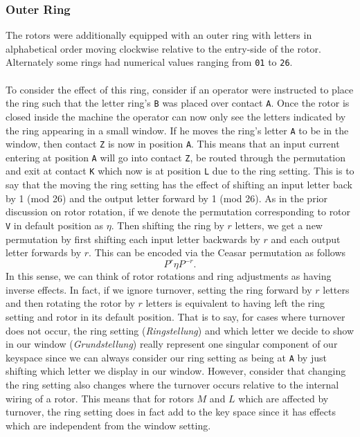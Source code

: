 \subsubsection{Outer Ring}

The rotors were additionally equipped with an outer ring with
letters in alphabetical order moving clockwise relative to the
entry-side of the rotor. Alternately some rings had numerical values
ranging from \texttt{01} to \texttt{26}.
\\\\To consider the effect of this ring,
consider if an operator were instructed to place the ring such that
the letter ring's \texttt{B} was placed over contact \texttt{A}. Once
the rotor is closed inside the machine
the operator can now only see the letters indicated by the ring
appearing in a small window. If he moves the ring's letter \texttt{A}
to be in the window, then contact \texttt{Z} is now in position
\texttt{A}. This means that an input current
entering at position \texttt{A} will go into contact \texttt{Z}, be
routed through the permutation and exit
at contact \texttt{K} which now is at position \texttt{L} due to the
ring setting. This is to say that the moving the ring
setting has the effect of shifting an input letter back by 1 (mod 26)
and the output letter forward by 1 (mod 26).
As in the prior discussion on rotor rotation, if we denote the
permutation corresponding to rotor \texttt{V} in default position as
$\eta$. Then shifting the ring by $r$ letters, we get a new
permutation by first shifting each input letter backwards by $r$ and
each output letter forwards by $r$. This can be encoded via the
Ceasar permutation as follows
\[
  {P^{r}}\eta{P^{-r}}.
\]
In this sense, we can think of rotor rotations and ring adjustments
as having inverse effects. In fact, if we ignore turnover, setting
the ring forward by $r$ letters and then rotating the rotor by $r$
letters is equivalent to having left the ring setting and rotor in
its default position. That is to say, for cases where turnover does
not occur, the ring setting (\emph{Ringstellung}) and which letter
we decide to show in our window (\emph{Grundstellung}) really
represent one singular component of our keyspace since we can always
consider our ring setting as being at \texttt{A} by just shifting
which letter we display in our window.
However, consider that changing the ring
setting also changes where the turnover occurs relative to the
internal wiring of a rotor. This means that for rotors $M$ and $L$
which are affected by turnover, the ring setting does in fact add to
the key space since it has effects which are independent from the
window setting.

